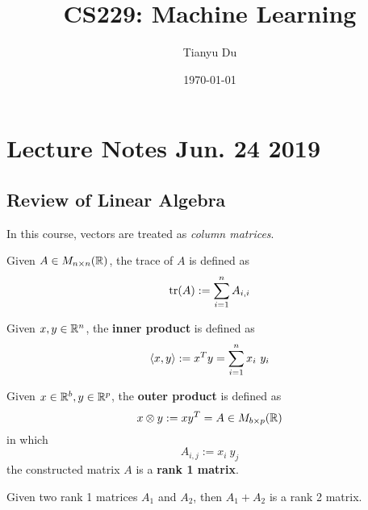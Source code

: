 \documentclass{article}
\title{CS229: Machine Learning}
\date{\today}
\author{Tianyu Du}
\begin{document}
    \maketitle
    \tableofcontents
    \newpage
    
    \section{Lecture Notes Jun. 24 2019}
    \subsection{Review of Linear Algebra}
    
    \begin{remark}
        In this course, vectors are treated as \emph{column matrices}.
    \end{remark}
    
    \begin{definition}
        Given $A \in M_{n \times n}(\mathbb{R})$, the trace of $A$ is defined as 
        \begin{equation}
            \text{{tr}}(A) := \sum_{i=1}^n A_{i,i}
        \end{equation}
    \end{definition}

    \begin{definition}
        Given $x, y \in \mathbb{R}^n$, the \textbf{inner product} is defined as 
        \begin{equation}
            \inner{x}{y} := x^T y = \sum_{i=1}^n x_i\ y_i
        \end{equation}
    \end{definition}

    \begin{definition}
        Given $x \in \mathbb{R}^b, y \in \mathbb{R}^p$, the \textbf{outer product} is defined as 
        \begin{equation}
            x \otimes y := x y^T = A \in M_{b \times p}(\mathbb{R})
        \end{equation}
        in which
        \begin{equation}
            A_{i, j} := x_i\ y_j
        \end{equation}
        the constructed matrix $A$ is a \textbf{rank 1 matrix}.
    \end{definition}
    
    \begin{remark}
        Given two rank 1 matrices $A_1$ and $A_2$, then $A_1 + A_2$ is a rank 2 matrix.
    \end{remark}
    
\end{document}
